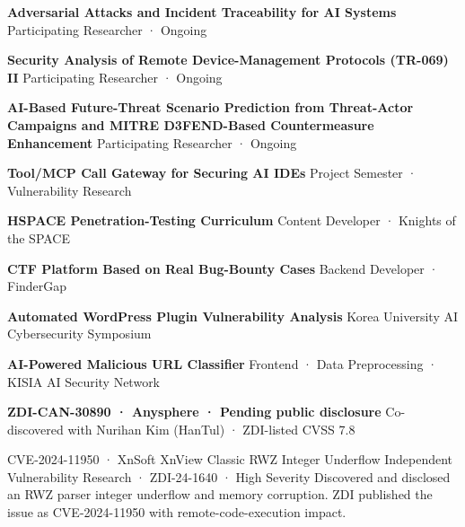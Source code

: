 \newpage


  {\textbf{Adversarial Attacks and Incident Traceability for AI Systems}}
  {Participating Researcher · Ongoing}

  {\textbf{Security Analysis of Remote Device-Management Protocols (TR-069) II}}
  {Participating Researcher · Ongoing}

  {\textbf{AI-Based Future-Threat Scenario Prediction from Threat-Actor Campaigns and MITRE D3FEND-Based Countermeasure Enhancement}}
  {Participating Researcher · Ongoing}

  {\textbf{Tool/MCP Call Gateway for Securing AI IDEs}}
  {Project Semester · Vulnerability Research}

  {\textbf{HSPACE Penetration-Testing Curriculum}}
  {Content Developer · Knights of the SPACE}

  {\textbf{CTF Platform Based on Real Bug-Bounty Cases}}
  {Backend Developer · FinderGap}

  {\textbf{Automated WordPress Plugin Vulnerability Analysis}}
  {Korea University AI Cybersecurity Symposium}

  {\textbf{AI-Powered Malicious URL Classifier}}
  {Frontend · Data Preprocessing · KISIA AI Security Network}


  {\textbf{ZDI-CAN-30890 · Anysphere · Pending public disclosure}}
  {Co-discovered with Nurihan Kim (HanTul) · ZDI-listed CVSS 7.8}

  {CVE-2024-11950 · XnSoft XnView Classic RWZ Integer Underflow}
  {Independent Vulnerability Research · ZDI-24-1640 · High Severity}
  {Discovered and disclosed an RWZ parser integer underflow and memory corruption. ZDI published the issue as CVE-2024-11950 with remote-code-execution impact.}


